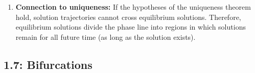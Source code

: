 \documentclass{article}
\begin{document}
\begin{enumerate}
\begin{enumerate}
    \item Find the equilibrium solutions.
    \item Draw the phase line.
    \item Classify each equilibrium as a sink, source, or semistable.
    \item Describe the long-term behavior for different initial conditions.
\end{enumerate}

Notice that
\[
f'(0)=f'(1)=0,
\]
so the derivative test is inconclusive. We must instead examine the sign of
$f(y)$ on either side of each equilibrium.

\item \textbf{Connection to uniqueness:} If the hypotheses of the uniqueness
theorem hold, solution trajectories cannot cross equilibrium solutions.
Therefore, equilibrium solutions divide the phase line into regions in which
solutions remain for all future time (as long as the solution exists).

\end{enumerate}


\subsection{1.7: Bifurcations}
\end{document}
